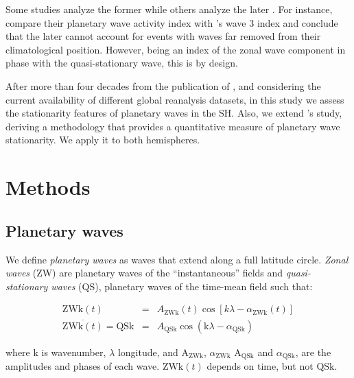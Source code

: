 \documentclass[draft,linenumbers]{agujournal2018}
\begin{document}
Some studies analyze the former \citep[e.g.~][\citet{quintanar1995a},
\citet{raphael2004}]{vanloon1972} while others analyze the later
\citep[e.g.~][\citet{turner2017}, \citet{irving2015}]{rao2004}. For
instance, \citet{irving2015} compare their planetary wave activity index
with \citet{raphael2004}'s wave 3 index and conclude that the later
cannot account for events with waves far removed from their
climatological position. However, being an index of the zonal wave
component in phase with the quasi-stationary wave, this is by design.

After more than four decades from the publication of
\citet{vanloon1972}, and considering the current availability of
different global reanalysis datasets, in this study we assess the
stationarity features of planetary waves in the SH. Also, we extend
\citet{vanloon1972}'s study, deriving a methodology that provides a
quantitative measure of planetary wave stationarity. We apply it to both
hemispheres.

\section{Methods}

\subsection{Planetary waves}

We define \emph{planetary waves} as waves that extend along a full
latitude circle. \emph{Zonal waves} (ZW) are planetary waves of the
``instantaneous'' fields and \emph{quasi-stationary waves} (QS),
planetary waves of the time-mean field such that:

\begin{linenomath*}
\begin{eqnarray}\label{eq:ZW}
\mathrm{ZWk}(t) & = & A_\mathrm{ZWk}(t)\cos \left [ k\lambda - \alpha_\mathrm{ZWk}(t) \right ] \\ 
\overline{\mathrm{ZWk}(t)} = \mathrm{QSk} & = & A_\mathrm{QSk}\cos \left (  \mathrm{k}\lambda - \alpha_\mathrm{QSk} \right ) \label{eq:QS}
\end{eqnarray}
\end{linenomath*}

where \(\mathrm{k}\) is wavenumber, \(\lambda\) longitude, and
\(\mathrm{A_{ZWk}}\), \(\alpha_\mathrm{ZWk}\) \(\mathrm{A_{QSk}}\) and
\(\alpha_\mathrm{QSk}\), are the amplitudes and phases of each wave.
\(\mathrm{ZWk}(t)\) depends on time, but not \(\mathrm{QSk}\).
\end{document}
